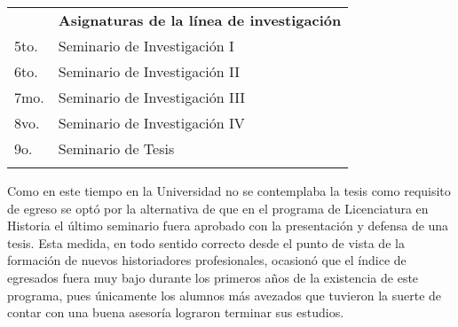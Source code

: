 \bigskip
\begin{flushleft}
\tablefirsthead{}
\tablehead{}
\tabletail{}
\tablelasttail{}
\setlength{\extrarowheight}{1pt}
\begin{supertabular}{|m{0.2\textwidth}|m{0.75\textwidth}|}
\hline
{}\\\hline
{} &
{\small\bfseries Asignaturas de la línea de investigación}\\\hline
5to. &
 Seminario de Investigación I\\\hline
6to.  &
 Seminario de Investigación II\\\hline
7mo. &
 Seminario de Investigación III\\\hline
8vo. &
 Seminario de Investigación IV\\\hline
9o. &
Seminario de Tesis\\\hline\hline
{}\\\hline%
\end{supertabular}
\end{flushleft}

Como en este tiempo en la Universidad no se contemplaba la tesis como 
requisito de egreso se optó por la alternativa de que en el programa de 
Licenciatura en Historia el último seminario fuera aprobado con la 
presentación y defensa de una tesis. Esta medida, en todo sentido 
correcto desde el punto de vista de la formación de nuevos 
historiadores profesionales, ocasionó que el índice de egresados fuera 
muy bajo durante los primeros años de la existencia de este programa, 
pues únicamente los alumnos más avezados que tuvieron la suerte de 
contar con una buena asesoría lograron terminar sus estudios.

